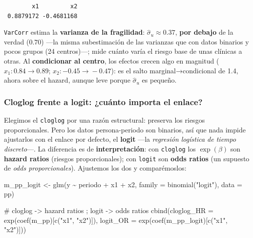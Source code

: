 \documentclass[
  letterpaper,
  DIV=11,
  numbers=noendperiod]{scrartcl}
\newenvironment{Shaded}{\begin{snugshade}}{\end{snugshade}}
\newcommand{\AttributeTok}[1]{\textcolor[rgb]{0.40,0.45,0.13}{#1}}
\newcommand{\CommentTok}[1]{\textcolor[rgb]{0.37,0.37,0.37}{#1}}
\newcommand{\FunctionTok}[1]{\textcolor[rgb]{0.28,0.35,0.67}{#1}}
\newcommand{\NormalTok}[1]{\textcolor[rgb]{0.00,0.23,0.31}{#1}}
\newcommand{\OtherTok}[1]{\textcolor[rgb]{0.00,0.23,0.31}{#1}}
\newcommand{\SpecialCharTok}[1]{\textcolor[rgb]{0.37,0.37,0.37}{#1}}
\newcommand{\StringTok}[1]{\textcolor[rgb]{0.13,0.47,0.30}{#1}}
\begin{document}
\begin{verbatim}
        x1         x2 
 0.8879172 -0.4681168 
\end{verbatim}

\texttt{VarCorr} estima la \textbf{varianza de la fragilidad}:
\(\hat\sigma_u\approx0.37\), \textbf{por debajo} de la verdad (\(0.70\))
---la misma subestimación de las varianzas que con datos binarios y
pocos grupos (24 centros)---; mide cuánto varía el riesgo base de unas
clínicas a otras. Al \textbf{condicionar al centro}, los efectos crecen
algo en magnitud (\(x_1: 0.84\!\to\!0.89\); \(x_2: -0.45\!\to\!-0.47\)):
es el salto marginal→condicional de 1.4, ahora sobre el hazard, aunque
leve porque \(\hat\sigma_u\) es pequeño.

\hypertarget{sec-u15-logit}{%
\subsubsection{Cloglog frente a logit: ¿cuánto importa el
enlace?}\label{sec-u15-logit}}

Elegimos el \texttt{cloglog} por una razón estructural: preserva los
riesgos proporcionales. Pero los datos persona-periodo son binarios, así
que nada impide ajustarlos con el enlace por defecto, el \textbf{logit}
---la \emph{regresión logística de tiempo discreto}---. La diferencia es
de \textbf{interpretación}: con \texttt{cloglog} los \(\exp(\beta)\) son
\textbf{hazard ratios} (riesgos proporcionales); con \texttt{logit} son
\textbf{odds ratios} (un supuesto de \emph{odds proporcionales}).
Ajustemos los dos y comparémoslos:

\begin{Shaded}
\begin{Highlighting}[]
\NormalTok{m\_pp\_logit }\OtherTok{\textless{}{-}} \FunctionTok{glm}\NormalTok{(y }\SpecialCharTok{\textasciitilde{}}\NormalTok{ periodo }\SpecialCharTok{+}\NormalTok{ x1 }\SpecialCharTok{+}\NormalTok{ x2, }\AttributeTok{family =} \FunctionTok{binomial}\NormalTok{(}\StringTok{"logit"}\NormalTok{), }\AttributeTok{data =}\NormalTok{ pp)}

\CommentTok{\# cloglog {-}\textgreater{} hazard ratios ; logit {-}\textgreater{} odds ratios}
\FunctionTok{cbind}\NormalTok{(}\AttributeTok{cloglog\_HR =} \FunctionTok{exp}\NormalTok{(}\FunctionTok{coef}\NormalTok{(m\_pp)[}\FunctionTok{c}\NormalTok{(}\StringTok{"x1"}\NormalTok{, }\StringTok{"x2"}\NormalTok{)]),}
      \AttributeTok{logit\_OR   =} \FunctionTok{exp}\NormalTok{(}\FunctionTok{coef}\NormalTok{(m\_pp\_logit)[}\FunctionTok{c}\NormalTok{(}\StringTok{"x1"}\NormalTok{, }\StringTok{"x2"}\NormalTok{)]))}
\end{Highlighting}
\end{Shaded}
\end{document}
